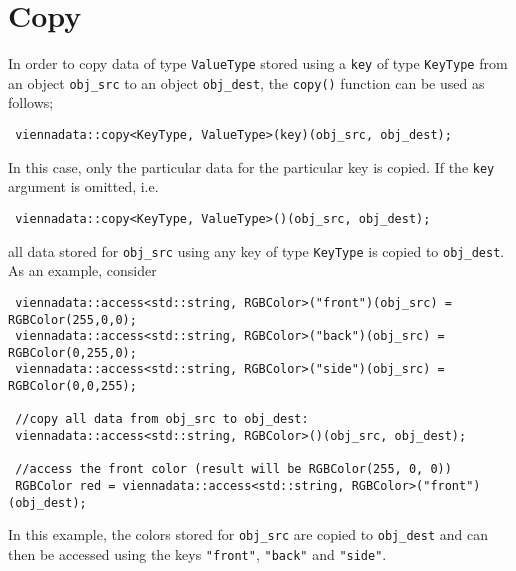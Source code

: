 \section{Copy} \label{sec:copy}
In order to copy data of type \lstinline|ValueType| stored using a \lstinline|key| of type \lstinline|KeyType| from an object \lstinline|obj_src| to an object \lstinline|obj_dest|,
the \lstinline|copy()| function can be used as follows;
\begin{lstlisting}
 viennadata::copy<KeyType, ValueType>(key)(obj_src, obj_dest);
\end{lstlisting}
In this case, only the particular data for the particular key is copied. If the \lstinline|key| argument is omitted, i.e.
\begin{lstlisting}
 viennadata::copy<KeyType, ValueType>()(obj_src, obj_dest);
\end{lstlisting}
all data stored for \lstinline|obj_src| using any key of type \lstinline|KeyType| is copied to \lstinline|obj_dest|.
As an example, consider
\begin{lstlisting}
 viennadata::access<std::string, RGBColor>("front")(obj_src) = RGBColor(255,0,0);
 viennadata::access<std::string, RGBColor>("back")(obj_src) = RGBColor(0,255,0);
 viennadata::access<std::string, RGBColor>("side")(obj_src) = RGBColor(0,0,255);

 //copy all data from obj_src to obj_dest:
 viennadata::access<std::string, RGBColor>()(obj_src, obj_dest);

 //access the front color (result will be RGBColor(255, 0, 0))
 RGBColor red = viennadata::access<std::string, RGBColor>("front")(obj_dest);
\end{lstlisting}
In this example, the colors stored for \lstinline|obj_src| are copied to \lstinline|obj_dest| and can then be accessed using the keys \lstinline|"front"|, \lstinline|"back"| and \lstinline|"side"|.



